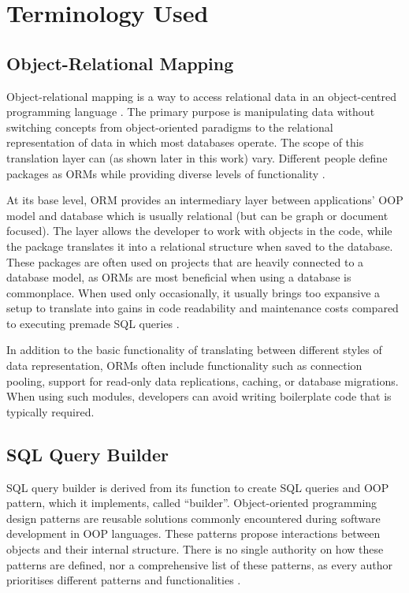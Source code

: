 \chapter{Terminology Used}
\section*{Object-Relational Mapping}
Object-relational mapping is a way to access relational data in an
object-centred programming language \cite{agile-mapping-objects}. The primary
purpose is manipulating data without switching concepts from object-oriented
paradigms to the relational representation of data in which most databases
operate. The scope of this translation layer can (as shown later in this work)
vary. Different people define packages as ORMs while providing diverse levels of
functionality \cite{artima-abstractions}.

At its base level, ORM provides an intermediary layer between applications' OOP
model and database which is usually relational (but can be graph or document
focused). The layer allows the developer to work with objects in the code, while
the package translates it into a relational structure when saved to the
database. These packages are often used on projects that are heavily connected
to a database model, as ORMs are most beneficial when using a database is
commonplace. When used only occasionally, it usually brings too expansive a
setup to translate into gains in code readability and maintenance costs compared
to executing premade SQL queries \cite{Torres_Galante_Pimenta_Martins_2017}.

In addition to the basic functionality of translating between different styles
of data representation, ORMs often include functionality such as connection
pooling, support for read-only data replications, caching, or database
migrations. When using such modules, developers can avoid writing boilerplate
code that is typically required.


\section*{SQL Query Builder}
SQL query builder is derived from its function to create SQL queries and OOP
pattern, which it implements, called \enquote{builder}. Object-oriented
programming design patterns are reusable solutions commonly encountered during
software development in OOP languages. These patterns propose interactions
between objects and their internal structure. There is no single authority on
how these patterns are defined, nor a comprehensive list of these patterns, as
every author prioritises different patterns and functionalities
\cite{fowler-patterns-2003}.

